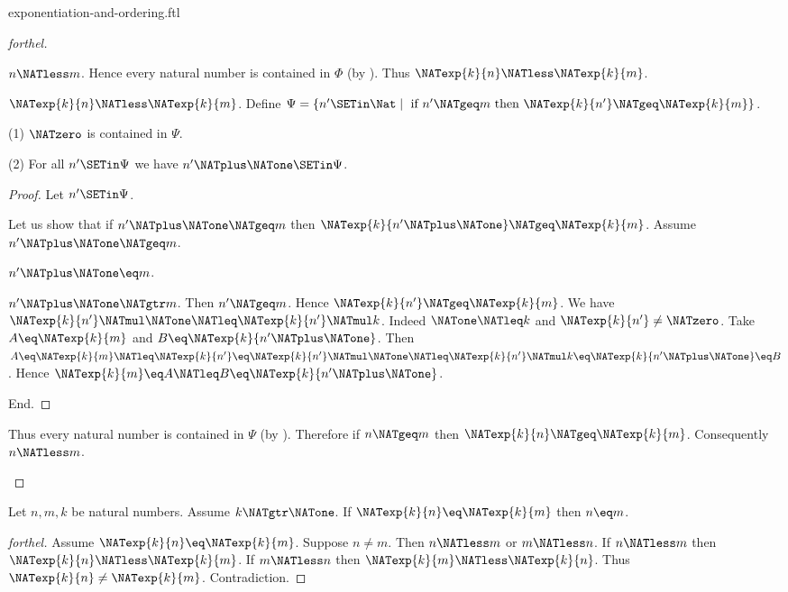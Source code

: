 \documentclass{naproche-library}
\begin{document}
\begin{smodule}[title=Exponentiation and Ordering]{exponentiation-and-ordering.ftl}
\begin{proof}[forthel]
\begin{case}{$n \NATless m$.}
    Hence every natural number is contained in $\Phi$ (by ).
    Thus $\NATexp{k}{n} \NATless \NATexp{k}{m}$.
  \end{case}

  \begin{case}{$\NATexp{k}{n} \NATless \NATexp{k}{m}$.}
    Define $\Psi = \{ n' \SETin \Nat \mid\text{ if }n' \NATgeq m\text{ then }
    \NATexp{k}{n'} \NATgeq \NATexp{k}{m} \}$.

    (1) $\NATzero$ is contained in $\Psi$.

    (2) For all $n' \SETin \Psi$ we have $n' \NATplus \NATone \SETin \Psi$.
    \begin{proof}
      Let $n' \SETin \Psi$.

      Let us show that if $n' \NATplus \NATone \NATgeq m$ then $\NATexp{k}{n' \NATplus \NATone} \NATgeq \NATexp{k}{m}$.
        Assume $n' \NATplus \NATone \NATgeq m$.

        \begin{case}{$n' \NATplus \NATone \eq m$.} \end{case}

        \begin{case}{$n' \NATplus \NATone \NATgtr m$.}
          Then $n' \NATgeq m$.
          Hence $\NATexp{k}{n'} \NATgeq \NATexp{k}{m}$.
          We have $\NATexp{k}{n'} \NATmul \NATone \NATleq \NATexp{k}{n'} \NATmul k$.
          Indeed $\NATone \NATleq k$ and $\NATexp{k}{n'} \neq \NATzero$.
          Take $A \eq \NATexp{k}{m}$ and $B \eq \NATexp{k}{n' \NATplus \NATone}$. %
          Then $A
            \eq \NATexp{k}{m}
            \NATleq \NATexp{k}{n'}
            \eq \NATexp{k}{n'} \NATmul \NATone
            \NATleq \NATexp{k}{n'} \NATmul k
            \eq \NATexp{k}{n' \NATplus \NATone}
            \eq B$.
          Hence $\NATexp{k}{m} \eq A \NATleq B \eq \NATexp{k}{n' \NATplus \NATone}$.
        \end{case}
      End.
    \end{proof}

    Thus every natural number is contained in $\Psi$ (by ).
    Therefore if $n \NATgeq m$ then $\NATexp{k}{n} \NATgeq \NATexp{k}{m}$.
    Consequently $n \NATless m$.
  \end{case}
\end{proof}

\begin{corollary}[forthel,id=ARITHMETIC_09_6780506905509888]
  Let $n, m, k$ be natural numbers.
  Assume $k \NATgtr \NATone$.
  If $\NATexp{k}{n} \eq \NATexp{k}{m}$ then $n \eq m$.
\end{corollary}
\begin{proof}[forthel]
  Assume $\NATexp{k}{n} \eq \NATexp{k}{m}$.
  Suppose $n \neq m$.
  Then $n \NATless m$ or $m \NATless n$.
  If $n \NATless m$ then $\NATexp{k}{n} \NATless \NATexp{k}{m}$.
  If $m \NATless n$ then $\NATexp{k}{m} \NATless \NATexp{k}{n}$.
  Thus $\NATexp{k}{n} \neq \NATexp{k}{m}$.
  Contradiction.
\end{proof}


\end{smodule}
\end{document}
